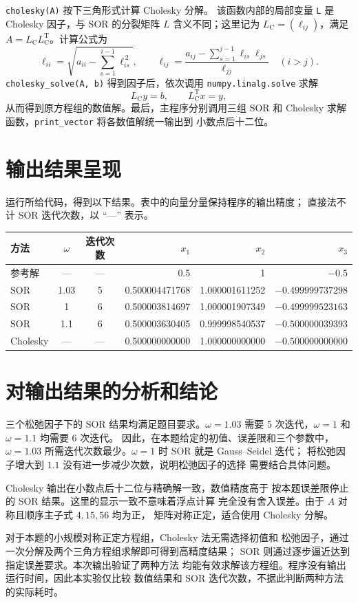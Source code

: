 \documentclass[UTF8,a4paper,11pt,fontset=fandol]{ctexart}
\begin{document}
\texttt{cholesky(A)} 按下三角形式计算 Cholesky 分解。
该函数内部的局部变量 \texttt{L} 是 Cholesky 因子，与 SOR 的分裂矩阵
$L$ 含义不同；这里记为 $L_{\mathrm C}=(\ell_{ij})$，满足
$A=L_{\mathrm C}L_{\mathrm C}^{\mathrm T}$。计算公式为
\[
\ell_{ii}=\sqrt{a_{ii}-\sum_{s=1}^{i-1}\ell_{is}^{\,2}},\qquad
\ell_{ij}=\frac{a_{ij}-\sum_{s=1}^{j-1}\ell_{is}\ell_{js}}{\ell_{jj}}
\quad(i>j).
\]
\texttt{cholesky\_solve(A, b)} 得到因子后，依次调用
\texttt{numpy.linalg.solve} 求解
\[
L_{\mathrm C}y=b,\qquad L_{\mathrm C}^{\mathrm T}x=y,
\]
从而得到原方程组的数值解。最后，主程序分别调用三组 SOR 和
Cholesky 求解函数，\texttt{print\_vector} 将各数值解统一输出到
小数点后十二位。

\section{输出结果呈现}

运行所给代码，得到以下结果。表中的向量分量保持程序的输出精度；
直接法不计 SOR 迭代次数，以 ``---'' 表示。

\begin{center}
\small
\setlength{\tabcolsep}{4pt}
\begin{tabular}{lccrrr}
\toprule
方法 & $\omega$ & 迭代次数 & $x_1$ & $x_2$ & $x_3$\\
\midrule
参考解 & --- & --- & 0.5 & 1 & $-0.5$\\
SOR & 1.03 & 5
& 0.500004471768 & 1.000001611252 & $-0.499999737298$\\
SOR & 1 & 6
& 0.500003814697 & 1.000001907349 & $-0.499999523163$\\
SOR & 1.1 & 6
& 0.500003630405 & 0.999998540537 & $-0.500000039393$\\
Cholesky & --- & ---
& 0.500000000000 & 1.000000000000 & $-0.500000000000$\\
\bottomrule
\end{tabular}
\end{center}

\section{对输出结果的分析和结论}

三个松弛因子下的 SOR 结果均满足题目要求。$\omega=1.03$ 需要
5 次迭代，$\omega=1$ 和 $\omega=1.1$ 均需要 6 次迭代。
因此，在本题给定的初值、误差限和三个参数中，$\omega=1.03$
所需迭代次数最少。$\omega=1$ 时 SOR 就是 Gauss--Seidel 迭代；
将松弛因子增大到 $1.1$ 没有进一步减少次数，说明松弛因子的选择
需要结合具体问题。

Cholesky 输出在小数点后十二位与精确解一致，数值精度高于
按本题误差限停止的 SOR 结果。这里的显示一致不意味着浮点计算
完全没有舍入误差。由于 $A$ 对称且顺序主子式 $4,15,56$ 均为正，
矩阵对称正定，适合使用 Cholesky 分解。

对于本题的小规模对称正定方程组，Cholesky 法无需选择初值和
松弛因子，通过一次分解及两个三角方程组求解即可得到高精度结果；
SOR 则通过逐步逼近达到指定误差要求。本次输出验证了两种方法
均能有效求解该方程组。程序没有输出运行时间，因此本实验仅比较
数值结果和 SOR 迭代次数，不据此判断两种方法的实际耗时。
\end{document}
